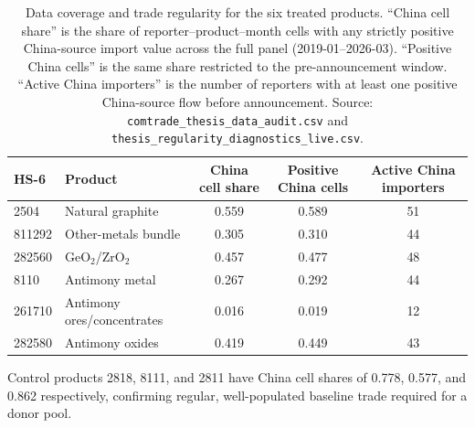 \begin{table}[H]
\centering
\caption{Data coverage and trade regularity for the six treated products.
``China cell share'' is the share of reporter--product--month cells with any
strictly positive China-source import value across the full panel
(2019-01--2026-03). ``Positive China cells'' is the same share restricted to the
pre-announcement window. ``Active China importers'' is the number of reporters
with at least one positive China-source flow before announcement. Source:
\texttt{comtrade\_thesis\_data\_audit.csv} and
\texttt{thesis\_regularity\_diagnostics\_live.csv}.}
\label{tab:coverage}
\footnotesize
\begin{tabular}{llccc}
\toprule
HS-6 & Product & China cell share & Positive China cells & Active China importers \\
\midrule
2504   & Natural graphite                & 0.559 & 0.589 & 51 \\
811292 & Other-metals bundle            & 0.305 & 0.310 & 44 \\
282560 & GeO$_2$/ZrO$_2$                 & 0.457 & 0.477 & 48 \\
8110   & Antimony metal                  & 0.267 & 0.292 & 44 \\
261710 & Antimony ores/concentrates      & 0.016 & 0.019 & 12 \\
282580 & Antimony oxides                 & 0.419 & 0.449 & 43 \\
\bottomrule
\end{tabular}

\smallskip
\footnotesize Control products 2818, 8111, and 2811 have China cell shares of
0.778, 0.577, and 0.862 respectively, confirming regular, well-populated
baseline trade required for a donor pool.
\end{table}
